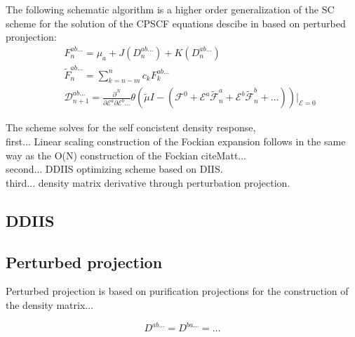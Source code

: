 \documentclass[twocolumn,showpacs,preprintnumbers,amsmath,amssymb]{revtex4}
\begin{document}
 The following schematic algorithm is a higher order generalization of the
 SC scheme for the solution of the CPSCF equations descibe in \cite{SV} 
 based on perturbed pronjection:
 \begin{subequations}
   \begin{eqnarray}
     &&  F^{ab\ldots}_{n}=
         \mu_a+J(D^{ab\ldots}_n)+K(D^{ab\ldots}_n) \label{FockBuild} \\
     && \displaystyle\widetilde{F}^{ab\ldots}_{n}=
         \sum_{k=n-m}^{n}c_k F^{ab\ldots}_{k} \label{DDIIS} \\
     && \displaystyle\mathcal{D}^{ab\ldots}_{n+1}=
	 \frac{\partial^N}{\partial\mathcal{E}^a \partial\mathcal{E}^b\ldots}
	 \theta(\tilde{\mu}I-(\mathcal{F}^{0}
	 +\mathcal{E}^{a}\widetilde{\mathcal{F}}^{a}_n
	 +\mathcal{E}^{b}\widetilde{\mathcal{F}}^{b}_n+\ldots))
	 \bigg|_{\mathcal{E}=0} \label{DDeriv}
   \end{eqnarray} 
 \end{subequations}

The scheme solves for the self concistent density response, \\
first... Linear scaling construction of the Fockian expansion follows in
the same way as the O(N) construction of the Fockian cite{Matt...}\\
second... DDIIS optimizing scheme based on DIIS.\\
third... density matrix derivative through perturbation projection.\\



\subsection{DDIIS}

\subsection{Perturbed projection}
Perturbed projection is based on purification projections for the 
construction of the density matrix...

\begin{equation}
  D^{ab\ldots}=D^{ba\ldots}=\ldots
\end{equation}
\end{document}
